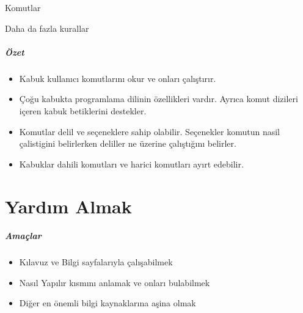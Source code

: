 \documentclass[10pt,a5paper]{book}
\begin{document}
\begin{section}{Komutlar}
\begin{subsection}{Daha da fazla kurallar}
\paragraph{Özet}{
\begin{itemize}
\item Kabuk kullanıcı komutlarını okur ve onları çalıştırır.
\item Çoğu kabukta programlama dilinin özellikleri vardır. Ayrıca komut dizileri içeren kabuk betiklerini destekler.
\item Komutlar delil ve seçeneklere sahip olabilir. Seçenekler komutun nasil çalistigini belirlerken deliller ne üzerine çalıştığını belirler.
\item Kabuklar dahili komutları ve harici komutları ayırt edebilir.
\end{itemize}}
\end{subsection}
\end{section}

\chapter{Yardım Almak}
\paragraph{Amaçlar}
\begin{itemize}
 \item Kılavuz ve Bilgi sayfalarıyla çalışabilmek
 \item Nasıl Yapılır kısmını anlamak ve onları bulabilmek
 \item Diğer en önemli bilgi kaynaklarına aşina olmak
 \end{itemize}
\end{document}
